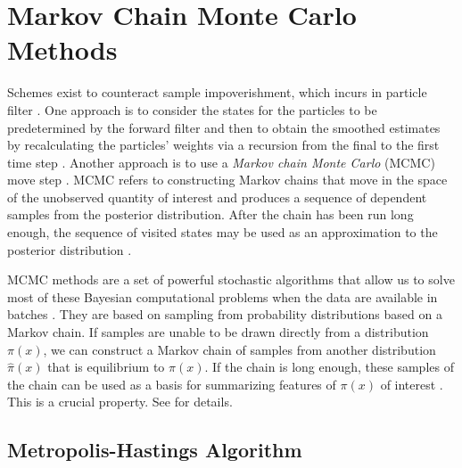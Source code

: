 \section{Markov Chain Monte Carlo Methods}


Schemes exist to counteract sample impoverishment, which incurs in particle filter \citep{ristic2004beyond}. One approach is to consider the states for the particles to be predetermined by the forward filter and then to obtain the smoothed estimates by recalculating the particles' weights via a recursion from the final to the first time step \citep{godsill2000methodology}. Another approach is to use a \textit{Markov chain Monte Carlo} (MCMC) move step \citep{carlin1992monte}. MCMC refers to constructing Markov chains that move in the space of the unobserved quantity of interest and produces a sequence of dependent samples from the posterior distribution. After the chain has been run long enough, the sequence of visited states may be used as an approximation to the posterior distribution \citep{kokkala2016particle}. 


MCMC methods are a set of powerful stochastic algorithms that allow us to solve most of these Bayesian computational problems when the data are available in batches \citep{andrieu1999sequential, green1995reversible, andrieu2001model}. They are based on sampling from probability distributions based on a Markov chain. If samples are unable to be drawn directly from a distribution $\pi(x)$, we can construct a Markov chain of samples from another distribution $\hat{\pi}(x)$ that is equilibrium to $\pi(x)$. If the chain is long enough, these samples of the chain can be used as a basis for summarizing features of $\pi(x)$ of interest \citep{smith1993bayesian}. This is a crucial property. See \eg \citep{cappe2009inference, liu2008monte} for details. 




\subsection*{Metropolis-Hastings Algorithm}


